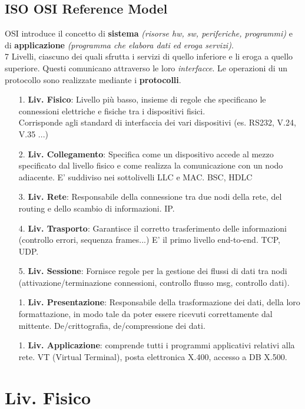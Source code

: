 \documentclass[a4paper,11pt]{article}
\begin{document}
\subsection{ISO OSI Reference Model}
OSI introduce il concetto di \textbf{sistema} \textit{(risorse hw, sw, periferiche, programmi)} e di \textbf{applicazione} \textit{(programma che elabora dati ed eroga servizi)}.\\
7 Livelli, ciascuno dei quali sfrutta i servizi di quello inferiore e li eroga a quello superiore. Questi comunicano attraverso le loro \textit{interfacce}. Le operazioni di un protocollo sono realizzate mediante i \textbf{protocolli}.
\begin{itemize}
\item[1.] \textbf{Liv. Fisico}: Livello più basso, insieme di regole che specificano le connessioni elettriche e fisiche tra i dispositivi fisici.\\
Corrisponde agli standard di interfaccia dei vari dispositivi (es. RS232, V.24, V.35 ...)
\item[2.] \textbf{Liv. Collegamento}: Specifica come un dispositivo accede al mezzo specificato dal livello fisico e come realizza la comunicazione con un nodo adiacente. E' suddiviso nei sottolivelli LLC e MAC. BSC, HDLC
\item[3.] \textbf{Liv. Rete}: Responsabile della connessione tra due nodi della rete, del routing e dello scambio di informazioni. IP.
\item[4.] \textbf{Liv. Trasporto}: Garantisce il corretto trasferimento delle informazioni (controllo errori, sequenza frames...) E' il primo livello end-to-end. TCP, UDP.
\item[5.] \textbf{Liv. Sessione}: Fornisce regole per la gestione dei flussi di dati tra nodi (attivazione/terminazione connessioni, controllo flusso msg, controllo dati).
\item[1.] \textbf{Liv. Presentazione}: Responsabile della trasformazione dei dati, della loro formattazione, in modo tale da poter essere ricevuti correttamente dal mittente. De/crittografia, de/compressione dei dati.
\item[1.] \textbf{Liv. Applicazione}: comprende tutti i programmi applicativi relativi alla rete. VT (Virtual Terminal), posta elettronica X.400, accesso a DB X.500.
\end{itemize}
\newpage

\section{Liv. Fisico}
\end{document}

